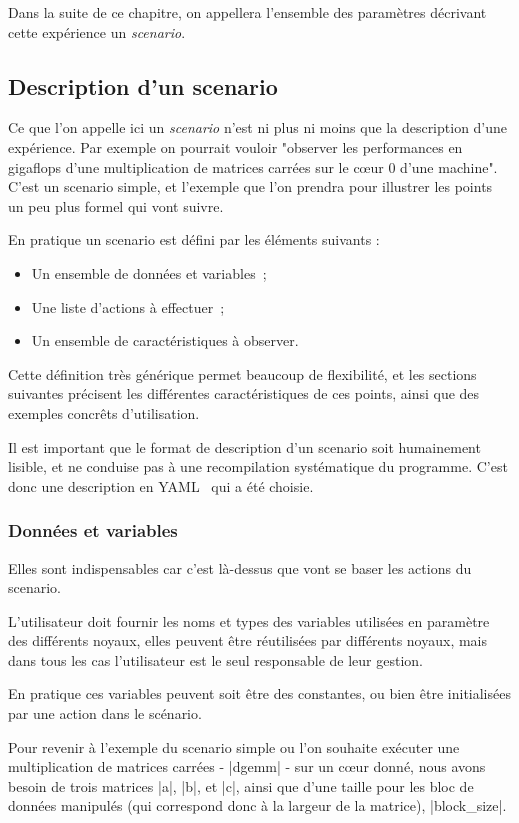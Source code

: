 Dans la suite de ce chapitre, on appellera l'ensemble des paramètres décrivant cette expérience un \emph{scenario}.

\subsection{Description d'un scenario}

Ce que l'on appelle ici un \emph{scenario} n'est ni plus ni moins que la description d'une expérience.
Par exemple on pourrait vouloir "observer les performances en gigaflops d'une multiplication de matrices carrées sur le cœur 0 d'une machine".
C'est un scenario simple, et l'exemple que l'on prendra pour illustrer les points un peu plus formel qui vont suivre.

En pratique un scenario est défini par les éléments suivants :
\begin{itemize}
 \item Un ensemble de données et variables~;
 \item Une liste d'actions à effectuer~;
 \item Un ensemble de caractéristiques à observer.
\end{itemize}

Cette définition très générique permet beaucoup de flexibilité, et les sections suivantes précisent les différentes caractéristiques de ces points, ainsi que des exemples concrêts d'utilisation.

Il est important que le format de description d'un scenario soit humainement lisible, et ne conduise pas à une recompilation systématique du programme. C'est donc une description en YAML~\cite{YAML} qui a été choisie.

\subsubsection{Données et variables}

Elles sont indispensables car c'est là-dessus que vont se baser les actions du scenario.

L'utilisateur doit fournir les noms et types des variables utilisées en paramètre des différents noyaux, elles peuvent être réutilisées par différents noyaux, mais dans tous les cas l'utilisateur est le seul responsable de leur gestion.

En pratique ces variables peuvent soit être des constantes, ou bien être initialisées par une action dans le scénario.

Pour revenir à l'exemple du scenario simple ou l'on souhaite exécuter une multiplication de matrices carrées - |dgemm| - sur un cœur donné, nous avons besoin de trois matrices |a|, |b|, et |c|, ainsi que d'une taille pour les bloc de données manipulés (qui correspond donc à la largeur de la matrice), |block_size|.

